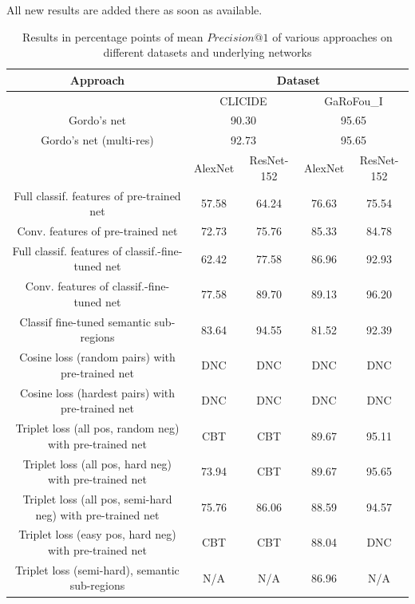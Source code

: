 \documentclass[fleqn]{article}
\begin{document}
All new results are added there as soon as available.

\begin{table}
\begin{tabular}{|c|c|c||c|c|}
\hline
Approach & \multicolumn{4}{|c|}{Dataset}\\
\hline
& \multicolumn{2}{|c||}{CLICIDE} & \multicolumn{2}{|c|}{GaRoFou\_I}\\
\hline
Gordo's net & \multicolumn{2}{|c||}{90.30} & \multicolumn{2}{|c|}{95.65}\\
\hline
Gordo's net (multi-res) & \multicolumn{2}{|c||}{92.73} & \multicolumn{2}{|c|}{95.65}\\
\hline
& AlexNet & ResNet-152 & AlexNet & ResNet-152\\
\hline
Full classif. features of pre-trained net
& 57.58 & 64.24 & 76.63 & 75.54 \\
\hline
Conv. features of pre-trained net
& 72.73 & 75.76 & 85.33 & 84.78 \\
\hline
Full classif. features of classif.-fine-tuned net
& 62.42 & 77.58 & 86.96 & 92.93 \\
\hline
Conv. features of classif.-fine-tuned net
& 77.58 & 89.70 & 89.13 & 96.20 \\
\hline
Classif fine-tuned semantic sub-regions
& 83.64 & 94.55 & 81.52 & 92.39 \\
\hline
Cosine loss (random pairs) with pre-trained net
& DNC & DNC & DNC & DNC \\
\hline
Cosine loss (hardest pairs) with pre-trained net
& DNC & DNC & DNC & DNC \\
\hline
Triplet loss (all pos, random neg) with pre-trained net
& CBT & CBT & 89.67 & 95.11 \\
\hline
Triplet loss (all pos, hard neg) with pre-trained net
& 73.94 & CBT & 89.67 & 95.65 \\
\hline
Triplet loss (all pos, semi-hard neg) with pre-trained net
& 75.76 & 86.06 & 88.59 & 94.57 \\
\hline
Triplet loss (easy pos, hard neg) with pre-trained net
& CBT & CBT & 88.04 & DNC \\
\hline
Triplet loss (semi-hard), semantic sub-regions
& N/A & N/A & 86.96 & N/A \\
\hline
\end{tabular}
\caption{Results in percentage points of mean $Precision@1$ of various approaches on different datasets and underlying networks\label{tab:results}}
\end{table}
\end{document}
